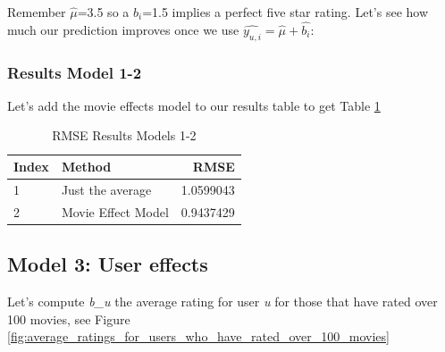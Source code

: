 \documentclass[
]{article}
\newenvironment{Shaded}{}{}
\newcommand{\AttributeTok}[1]{\textcolor[rgb]{0.49,0.56,0.16}{#1}}
\newcommand{\DecValTok}[1]{\textcolor[rgb]{0.25,0.63,0.44}{#1}}
\newcommand{\FloatTok}[1]{\textcolor[rgb]{0.25,0.63,0.44}{#1}}
\newcommand{\FunctionTok}[1]{\textcolor[rgb]{0.02,0.16,0.49}{#1}}
\newcommand{\NormalTok}[1]{#1}
\newcommand{\OtherTok}[1]{\textcolor[rgb]{0.00,0.44,0.13}{#1}}
\newcommand{\SpecialCharTok}[1]{\textcolor[rgb]{0.25,0.44,0.63}{#1}}
\newcommand{\StringTok}[1]{\textcolor[rgb]{0.25,0.44,0.63}{#1}}
\begin{document}
Remember \(\hat{\mu}\)=3.5 so a \(b_{i}\)=1.5 implies a perfect five
star rating. Let's see how much our prediction improves once we use
\(\hat{y_{u,i}}=\hat{\mu}+\hat{b_{i}}\):

\begin{Shaded}
\end{Shaded}

\newpage

\hypertarget{results-model-1-2}{%
\subsubsection{Results Model 1-2}\label{results-model-1-2}}

Let's add the movie effects model to our results table to get Table
\ref{tbl:rmse_results_model_1-2}

\begin{table}[H]

\caption{\label{tab:m_2_5}RMSE Results Models 1-2\label{tbl:rmse_results_model_1-2}}
\centering
\fontsize{7}{9}\selectfont
\begin{tabular}[t]{llr}
\toprule
Index & Method & RMSE\\
\midrule
1 & Just the average & 1.0599043\\
2 & Movie Effect Model & 0.9437429\\
\bottomrule
\end{tabular}
\end{table}

\newpage

\hypertarget{model-3-user-effects}{%
\subsection{Model 3: User effects}\label{model-3-user-effects}}

Let's compute \emph{b\_u} the average rating for user \emph{u} for those
that have rated over 100 movies, see Figure
\ref{fig:average_ratings_for_users_who_have_rated_over_100_movies}
\end{document}
